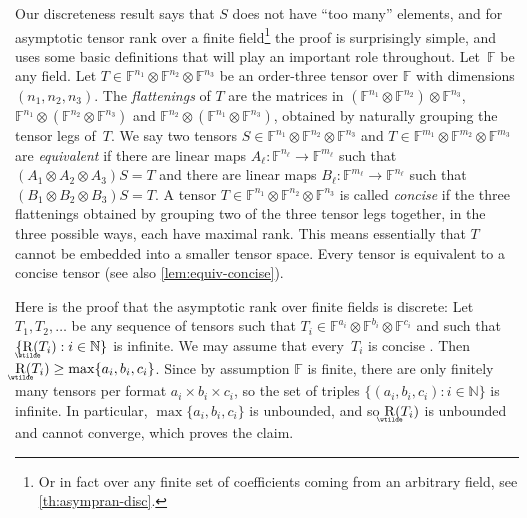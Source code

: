 \documentclass{daj}
\DeclareMathOperator{\asymprank}{\underaccent{\wtilde}{R}}
\newcommand{\FF}{\mathbb{F}}
\newcommand{\NN}{\mathbb{N}}
\begin{document}
Our discreteness result says that $S$ does not have ``too many'' elements, and for asymptotic tensor rank over a finite field\footnote{Or in fact over any finite set of coefficients coming from an arbitrary field, see \autoref{th:asympran-disc}.} the proof is surprisingly simple, 
and uses some basic definitions that will play an important role throughout. Let~$\FF$ be any field. Let $T \in \FF^{n_1} \otimes \FF^{n_2} \otimes \FF^{n_3}$ be an order-three tensor over $\FF$ with dimensions $(n_1, n_2, n_3)$. 
The \emph{flattenings} of $T$ are the matrices in $(\FF^{n_1} \otimes \FF^{n_2}) \otimes \FF^{n_3}$, $\FF^{n_1} \otimes (\FF^{n_2} \otimes \FF^{n_3})$ and $\FF^{n_2} \otimes (\FF^{n_1} \otimes \FF^{n_3})$, obtained by naturally grouping the tensor legs of~$T$. 
%
We say two tensors $S \in \FF^{n_1} \otimes \FF^{n_2} \otimes \FF^{n_3}$ and $T \in \FF^{m_1} \otimes \FF^{m_2} \otimes \FF^{m_3}$ are \emph{equivalent} if there are linear maps $A_\ell : \FF^{n_\ell} \to \FF^{m_\ell}$ such that $(A_1 \otimes A_2 \otimes A_3) S = T$ and there are linear maps $B_\ell : \FF^{m_\ell} \to \FF^{n_\ell}$ such that $(B_1 \otimes B_2 \otimes B_3) S = T$.
A tensor $T \in \FF^{n_1} \otimes \FF^{n_2} \otimes \FF^{n_3}$ is called \emph{concise} 
if the three flattenings obtained by grouping two of the three tensor legs together, in the three possible ways, each have maximal rank. This means essentially that $T$ cannot be embedded into a smaller tensor space. Every tensor is equivalent to a concise tensor \cite[Section 14.3]{burgisser1997algebraic} (see also \autoref{lem:equiv-concise}).

Here is the proof that the asymptotic rank over finite fields is discrete:
Let $T_1, T_2, \ldots$ be any sequence of tensors such that $T_i \in \FF^{a_i} \otimes \FF^{b_i} \otimes \FF^{c_i}$ and such that $\{\asymprank(T_i) : i \in \NN\}$ is infinite. 
We may assume that every~$T_i$ is concise 
. Then $\asymprank(T_i) \geq \max \{a_i, b_i, c_i\}$. Since by assumption $\FF$ is finite, there are only finitely many tensors per format $a_i \times b_i \times c_i$, so the set of triples $\{(a_i, b_i, c_i) : i \in \NN\}$ is infinite. In particular, $\max \{a_i, b_i, c_i\}$ is unbounded, and so $\asymprank(T_i)$ is unbounded and cannot converge, which proves the claim. 
\end{document}
